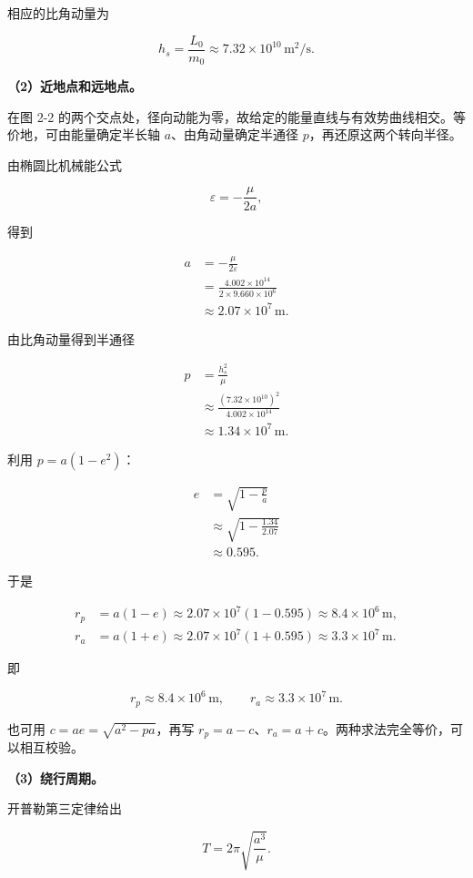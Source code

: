 \documentclass[12pt,a4paper,UTF8]{ctexart}
\begin{document}
相应的比角动量为

\[h_s=\frac{L_0}{m_0}\approx7.32\times10^{10}\,\mathrm{m^2/s}.\]

\textbf{（2）近地点和远地点。}

在图 2-2
的两个交点处，径向动能为零，故给定的能量直线与有效势曲线相交。等价地，可由能量确定半长轴
\(a\)、由角动量确定半通径 \(p\)，再还原这两个转向半径。

由椭圆比机械能公式

\[\varepsilon=-\frac\mu{2a},\]

得到

\[
\begin{aligned}
a&=-\frac\mu{2\varepsilon}\\
&=\frac{4.002\times10^{14}}{2\times9.660\times10^6}\\
&\approx2.07\times10^7\,\mathrm m.
\end{aligned}
\]

由比角动量得到半通径

\[
\begin{aligned}
p&=\frac{h_s^2}{\mu}\\
&\approx\frac{(7.32\times10^{10})^2}{4.002\times10^{14}}\\
&\approx1.34\times10^7\,\mathrm m.
\end{aligned}
\]

利用 \(p=a(1-e^2)\)：

\[
\begin{aligned}
e&=\sqrt{1-\frac pa}\\
&\approx\sqrt{1-\frac{1.34}{2.07}}\\
&\approx0.595.
\end{aligned}
\]

于是

\[
\begin{aligned}
r_p&=a(1-e)\approx2.07\times10^7(1-0.595)
\approx8.4\times10^6\,\mathrm m,\\
r_a&=a(1+e)\approx2.07\times10^7(1+0.595)
\approx3.3\times10^7\,\mathrm m.
\end{aligned}
\]

即

\[\boxed{r_p\approx8.4\times10^6\,\mathrm m,\qquad r_a\approx3.3\times10^7\,\mathrm m}.\]

也可用 \(c=ae=\sqrt{a^2-pa}\)，再写
\(r_p=a-c\)、\(r_a=a+c\)。两种求法完全等价，可以相互校验。

\textbf{（3）绕行周期。}

开普勒第三定律给出

\[T=2\pi\sqrt{\frac{a^3}{\mu}}.\]
\end{document}

